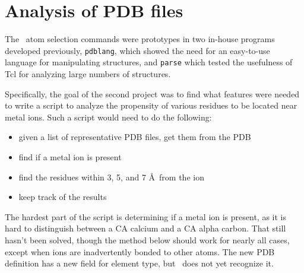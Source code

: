 \section{Analysis of PDB files}

	The \VMD\ atom selection commands were prototypes in two 
in-house programs developed previously, {\tt pdblang}, which showed the need 
for an easy-to-use language for manipulating structures, and 
{\tt parse} which tested the usefulness of Tcl for analyzing large numbers 
of structures.

	Specifically, the goal of the second project was to find what 
features were needed to write a script to analyze the propensity of 
various residues to be located near metal ions.  Such a script would 
need to do the following:
\begin{itemize}
 \item given a list of representative PDB files, get them from the PDB
 \item find if a metal ion is present
 \item find the residues within 3, 5, and 7 \AA\ from the ion
 \item keep track of the results
\end{itemize}


The hardest part of the script is determining if a metal ion is
present, as it is hard to distinguish between a CA calcium and a CA
alpha carbon.  That still hasn't been solved, though the method below
should work for nearly all cases, except when ions are inadvertently
bonded to other atoms.  The new PDB definition has a new field for
element type, but \VMD\ does not yet recognize it.

